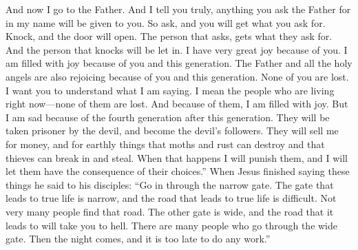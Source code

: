 And now I go to the Father. And I tell you truly, anything you ask the Father for in my name will be given to you.
\bverse \iffalse Therefore, ask, and ye shall receive; knock, and it shall be opened unto you; for he that asketh, receiveth; and unto him that knocketh, it shall be opened. \fi
So ask, and you will get what you ask for. Knock, and the door will open. The person that asks, gets what they ask for. And the person that knocks will be let in.
\bverse \iffalse And now, behold, my joy is great, even unto fulness, because of you, and also this generation; yea, and even the Father rejoiceth, and also all the holy angels, because of you and this generation; for none of them are lost. \fi
I have very great joy because of you. I am filled with joy because of you and this generation. The Father and all the holy angels are also rejoicing because of you and this generation. None of you are lost.
\bverse \iffalse Behold, I would that ye should understand; for I mean them who are now alive of this generation; and none of them are lost; and in them I have fulness of joy. \fi
I want you to understand what I am saying. I mean the people who are living right now---none of them are lost. And because of them, I am filled with joy.
\bverse \iffalse But behold, it sorroweth me because of the fourth generation from this generation, for they are led away captive by him even as was the son of perdition; for they will sell me for silver and for gold, and for that which moth doth corrupt and which thieves can break through and steal. And in that day will I visit them, even in turning their works upon their own heads. \fi
But I am sad because of the fourth generation after this generation. They will be taken prisoner by the devil, and become the devil's followers. They will sell me for money, and for earthly things that moths and rust can destroy and that thieves can break in and steal. When that happens I will punish them, and I will let them have the consequence of their choices.''
\bverse \iffalse And it came to pass that when Jesus had ended these sayings he said unto his disciples: Enter ye in at the strait gate; for strait is the gate, and narrow is the way that leads to life, and few there be that find it; but wide is the gate, and broad the way which leads to death, and many there be that travel therein, until the night cometh, wherein no man can work. \fi
When Jesus finished saying these things he said to his disciples: ``Go in through the narrow gate. The gate that leads to true life is narrow, and the road that leads to true life is difficult. Not very many people find that road. The other gate is wide, and the road that it leads to will take you to hell. There are many people who go through the wide gate. Then the night comes, and it is too late to do any work.''

